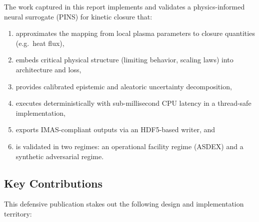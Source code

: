 \documentclass[11pt]{article}
\begin{document}
The work captured in this report implements and validates a physics-informed neural surrogate (PINS) for kinetic closure that:
\begin{enumerate}[label=(\alph*)]
  \item approximates the mapping from local plasma parameters to closure quantities (e.g.\ heat flux),
  \item embeds critical physical structure (limiting behavior, scaling laws) into architecture and loss,
  \item provides calibrated epistemic and aleatoric uncertainty decomposition,
  \item executes deterministically with sub-millisecond CPU latency in a thread-safe implementation,
  \item exports IMAS-compliant outputs via an HDF5-based writer, and
  \item is validated in two regimes: an operational facility regime (ASDEX) and a synthetic adversarial regime.
\end{enumerate}

\subsection{Key Contributions}

This defensive publication stakes out the following design and implementation territory:
\end{document}
